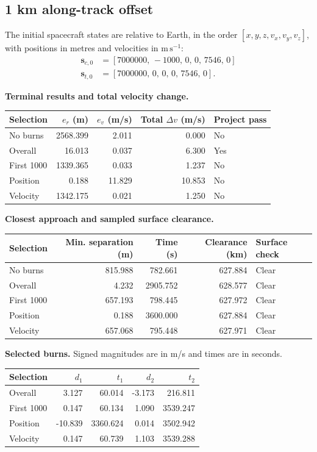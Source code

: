 \subsection{1 km along-track offset}
The initial spacecraft states are relative to Earth, in the order
$[x,y,z,v_x,v_y,v_z]$, with positions in metres and velocities in
$\mathrm{m\,s^{-1}}$:
\begin{align*}
\mathbf s_{c,0}&=[7000000,\,-1000,\,0,\,0,\,7546,\,0]\\
\mathbf s_{t,0}&=[7000000,\,0,\,0,\,0,\,7546,\,0].
\end{align*}
\par\noindent\textbf{Terminal results and total velocity change.}
\begin{center}
\begin{tabular}{lrrrl}
\toprule
Selection & $e_r$ (m) & $e_v$ (m/s) & Total $\Delta v$ (m/s) & Project pass\\
\midrule
No burns & 2568.399 & 2.011 & 0.000 & No\\
Overall & 16.013 & 0.037 & 6.300 & Yes\\
First 1000 & 1339.365 & 0.033 & 1.237 & No\\
Position & 0.188 & 11.829 & 10.853 & No\\
Velocity & 1342.175 & 0.021 & 1.250 & No\\
\bottomrule
\end{tabular}
\end{center}
\par\noindent\textbf{Closest approach and sampled surface clearance.}
\begin{center}
\begin{tabular}{lrrrl}
\toprule
Selection & Min. separation (m) & Time (s) & Clearance (km) & Surface check\\
\midrule
No burns & 815.988 & 782.661 & 627.884 & Clear\\
Overall & 4.232 & 2905.752 & 628.577 & Clear\\
First 1000 & 657.193 & 798.445 & 627.972 & Clear\\
Position & 0.188 & 3600.000 & 627.884 & Clear\\
Velocity & 657.068 & 795.448 & 627.971 & Clear\\
\bottomrule
\end{tabular}
\end{center}
\par\noindent\textbf{Selected burns.} Signed magnitudes are in m/s and times are in seconds.
\begin{center}
\begin{tabular}{lrrrr}
\toprule
Selection & $d_1$ & $t_1$ & $d_2$ & $t_2$\\
\midrule
Overall & 3.127 & 60.014 & -3.173 & 216.811\\
First 1000 & 0.147 & 60.134 & 1.090 & 3539.247\\
Position & -10.839 & 3360.624 & 0.014 & 3502.942\\
Velocity & 0.147 & 60.739 & 1.103 & 3539.288\\
\bottomrule
\end{tabular}
\end{center}
